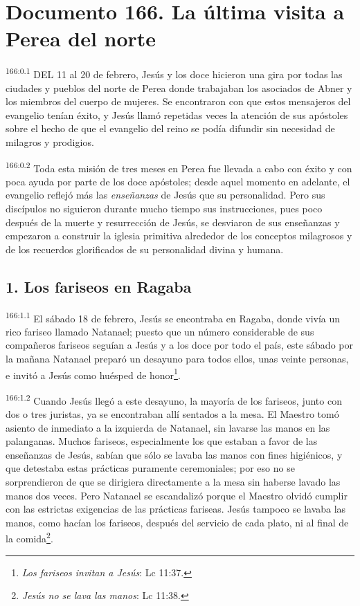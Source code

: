 \chapter{Documento 166. La última visita a Perea del norte}
\par
\textsuperscript{166:0.1} DEL 11 al 20 de febrero, Jesús y los doce hicieron una gira por todas las ciudades y pueblos del norte de Perea donde trabajaban los asociados de Abner y los miembros del cuerpo de mujeres. Se encontraron con que estos mensajeros del evangelio tenían éxito, y Jesús llamó repetidas veces la atención de sus apóstoles sobre el hecho de que el evangelio del reino se podía difundir sin necesidad de milagros y prodigios.

\par
\textsuperscript{166:0.2} Toda esta misión de tres meses en Perea fue llevada a cabo con éxito y con poca ayuda por parte de los doce apóstoles; desde aquel momento en adelante, el evangelio reflejó más las \textit{enseñanzas} de Jesús que su personalidad. Pero sus discípulos no siguieron durante mucho tiempo sus instrucciones, pues poco después de la muerte y resurrección de Jesús, se desviaron de sus enseñanzas y empezaron a construir la iglesia primitiva alrededor de los conceptos milagrosos y de los recuerdos glorificados de su personalidad divina y humana.

\section*{1. Los fariseos en Ragaba}
\par
\textsuperscript{166:1.1} El sábado 18 de febrero, Jesús se encontraba en Ragaba, donde vivía un rico fariseo llamado Natanael; puesto que un número considerable de sus compañeros fariseos seguían a Jesús y a los doce por todo el país, este sábado por la mañana Natanael preparó un desayuno para todos ellos, unas veinte personas, e invitó a Jesús como huésped de honor\footnote{\textit{Los fariseos invitan a Jesús}: Lc 11:37.}.

\par
\textsuperscript{166:1.2} Cuando Jesús llegó a este desayuno, la mayoría de los fariseos, junto con dos o tres juristas, ya se encontraban allí sentados a la mesa. El Maestro tomó asiento de inmediato a la izquierda de Natanael, sin lavarse las manos en las palanganas. Muchos fariseos, especialmente los que estaban a favor de las enseñanzas de Jesús, sabían que sólo se lavaba las manos con fines higiénicos, y que detestaba estas prácticas puramente ceremoniales; por eso no se sorprendieron de que se dirigiera directamente a la mesa sin haberse lavado las manos dos veces. Pero Natanael se escandalizó porque el Maestro olvidó cumplir con las estrictas exigencias de las prácticas fariseas. Jesús tampoco se lavaba las manos, como hacían los fariseos, después del servicio de cada plato, ni al final de la comida\footnote{\textit{Jesús no se lava las manos}: Lc 11:38.}.

